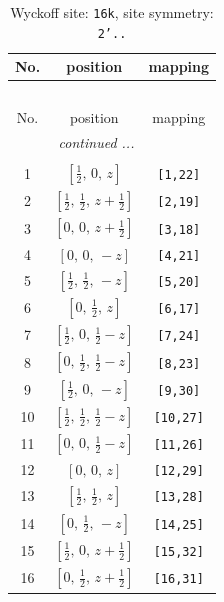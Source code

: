 \documentclass[fleqn,8pt]{jsarticle}
\begin{document}
\begin{longtable}{ccc}
\caption{Wyckoff site: {\tt 16k}, site symmetry: {\tt 2'..}}
 \\
 \hline \hline
No. & position & mapping \\ \hline \endfirsthead

\multicolumn{2}{l}{\tablename\ \thetable{}} \\
 \hline \hline
No. & position & mapping \\ \hline \endhead

 \hline \hline
\multicolumn{2}{r}{\footnotesize\it continued ...} \\ \endfoot

 \hline \hline
\multicolumn{2}{r}{} \\ \endlastfoot

1 & $\left[ \frac{1}{2},\, 0,\, z \right]$ & {\tt [1,22]} \\ \hline
2 & $\left[ \frac{1}{2},\, \frac{1}{2},\, z + \frac{1}{2} \right]$ & {\tt [2,19]} \\ \hline
3 & $\left[ 0,\, 0,\, z + \frac{1}{2} \right]$ & {\tt [3,18]} \\ \hline
4 & $\left[ 0,\, 0,\, - z \right]$ & {\tt [4,21]} \\ \hline
5 & $\left[ \frac{1}{2},\, \frac{1}{2},\, - z \right]$ & {\tt [5,20]} \\ \hline
6 & $\left[ 0,\, \frac{1}{2},\, z \right]$ & {\tt [6,17]} \\ \hline
7 & $\left[ \frac{1}{2},\, 0,\, \frac{1}{2} - z \right]$ & {\tt [7,24]} \\ \hline
8 & $\left[ 0,\, \frac{1}{2},\, \frac{1}{2} - z \right]$ & {\tt [8,23]} \\ \hline
9 & $\left[ \frac{1}{2},\, 0,\, - z \right]$ & {\tt [9,30]} \\ \hline
10 & $\left[ \frac{1}{2},\, \frac{1}{2},\, \frac{1}{2} - z \right]$ & {\tt [10,27]} \\ \hline
11 & $\left[ 0,\, 0,\, \frac{1}{2} - z \right]$ & {\tt [11,26]} \\ \hline
12 & $\left[ 0,\, 0,\, z \right]$ & {\tt [12,29]} \\ \hline
13 & $\left[ \frac{1}{2},\, \frac{1}{2},\, z \right]$ & {\tt [13,28]} \\ \hline
14 & $\left[ 0,\, \frac{1}{2},\, - z \right]$ & {\tt [14,25]} \\ \hline
15 & $\left[ \frac{1}{2},\, 0,\, z + \frac{1}{2} \right]$ & {\tt [15,32]} \\ \hline
16 & $\left[ 0,\, \frac{1}{2},\, z + \frac{1}{2} \right]$ & {\tt [16,31]} \\
\end{longtable}
\end{document}

